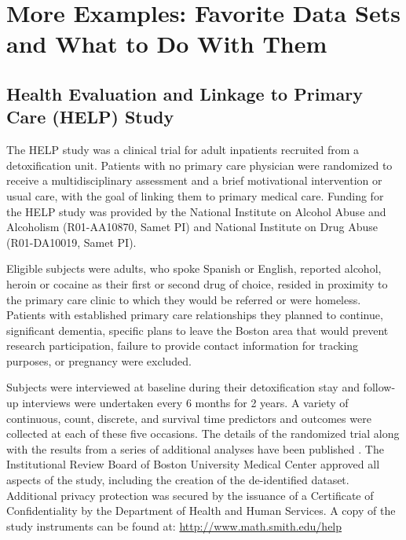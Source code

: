 
\chapter{More Examples: Favorite Data Sets and What to Do With Them}







\section{Health Evaluation and Linkage to Primary Care (HELP) Study}

\label{sec:help}

The HELP study was a clinical trial for adult inpatients recruited from a detoxification unit.
Patients with no primary care physician were randomized to receive a multidisciplinary assessment and a brief motivational intervention or usual care,
with the goal of linking them to primary medical care.
Funding for the HELP study was provided by the National Institute
on Alcohol Abuse and Alcoholism (R01-AA10870, Samet PI) and
National Institute on Drug Abuse (R01-DA10019, Samet PI).

Eligible subjects were
adults, who spoke Spanish or English, reported alcohol, heroin or
cocaine as their first or second drug of choice, resided in proximity
to the primary care clinic to which they would be referred or were
homeless.  Patients with established primary care relationships
they planned to continue, significant dementia, specific plans to
leave the Boston area that would prevent research participation,
failure to provide contact information for tracking purposes, or
pregnancy were excluded.

Subjects were interviewed at baseline during
their detoxification stay and follow-up interviews were undertaken
every 6 months for 2 years.  A variety of continuous, count, discrete, and survival time predictors and outcomes were collected at each of these five occasions.
The details of the
randomized trial along with the results from a series of additional analyses have been published \cite{same:lars:hort:2003,rees:sait:hort:2001,hort:sait:lair:2002,lieb:save:2002,kert:hort:frie:2003,sait:lars:2004,sait:hort:2005,shan:linc:2005,lars:sait:2006,wine:sait:2007}.
The Institutional Review Board of
Boston University Medical Center approved all aspects of the study, including the creation of the de-identified dataset.  Additional
privacy protection was secured by the issuance of a Certificate of
Confidentiality by the Department of Health and Human Services.
A copy of the study instruments can be found at: \url{http://www.math.smith.edu/help}

